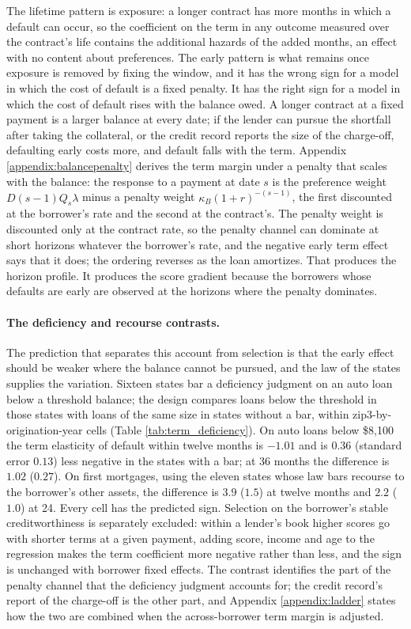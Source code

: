 The lifetime pattern is exposure: a longer contract has more months in which a default can occur, so the coefficient on the term in any outcome measured over the contract's life contains the additional hazards of the added months, an effect with no content about preferences. The early pattern is what remains once exposure is removed by fixing the window, and it has the wrong sign for a model in which the cost of default is a fixed penalty. It has the right sign for a model in which the cost of default rises with the balance owed. A longer contract at a fixed payment is a larger balance at every date; if the lender can pursue the shortfall after taking the collateral, or the credit record reports the size of the charge-off, defaulting early costs more, and default falls with the term. Appendix \ref{appendix:balancepenalty} derives the term margin under a penalty that scales with the balance: the response to a payment at date $s$ is the preference weight $D(s-1)Q_s\lambda$ minus a penalty weight $\kappa_B(1+r)^{-(s-1)}$, the first discounted at the borrower's rate and the second at the contract's. The penalty weight is discounted only at the contract rate, so the penalty channel can dominate at short horizons whatever the borrower's rate, and the negative early term effect says that it does; the ordering reverses as the loan amortizes. That produces the horizon profile. It produces the score gradient because the borrowers whose defaults are early are observed at the horizons where the penalty dominates.

\paragraph{The deficiency and recourse contrasts.} The prediction that separates this account from selection is that the early effect should be weaker where the balance cannot be pursued, and the law of the states supplies the variation. Sixteen states bar a deficiency judgment on an auto loan below a threshold balance; the design compares loans below the threshold in those states with loans of the same size in states without a bar, within zip3-by-origination-year cells (Table \ref{tab:term_deficiency}). On auto loans below \$8,100 the term elasticity of default within twelve months is $-1.01$ and is $0.36$ (standard error $0.13$) less negative in the states with a bar; at 36 months the difference is $1.02$ ($0.27$). On first mortgages, using the eleven states whose law bars recourse to the borrower's other assets, the difference is $3.9$ ($1.5$) at twelve months and $2.2$ ($1.0$) at 24. Every cell has the predicted sign. Selection on the borrower's stable creditworthiness is separately excluded: within a lender's book higher scores go with shorter terms at a given payment, adding score, income and age to the regression makes the term coefficient more negative rather than less, and the sign is unchanged with borrower fixed effects. The contrast identifies the part of the penalty channel that the deficiency judgment accounts for; the credit record's report of the charge-off is the other part, and Appendix \ref{appendix:ladder} states how the two are combined when the across-borrower term margin is adjusted.

